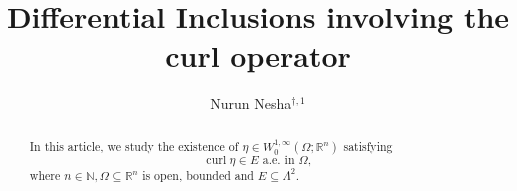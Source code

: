 \documentclass[11pt, a4paper, reqno]{amsart}
\title[Differential Inclusions involving the curl operator]{Differential Inclusions involving the curl operator}
\author[N. Nesha]{ Nurun Nesha$^{\dagger,1}$ }
\numberwithin{equation}{section}
\newcommand{\curl}{\operatorname{curl}}
\begin{document}
\begin{abstract}
In this article, we study the existence of $\eta\in W_0^{1,\infty}(\Omega;\mathbb R^n)$ satisfying $$\curl \eta\in E \textrm{ a.e. in }\Omega,$$
where $n\in \mathbb N, \Omega\subseteq \mathbb R^n$ is open, bounded and $E\subseteq \Lambda^2.$
\end{abstract}
	
\keywords{}
	
\subjclass[2010]{}

 
\maketitle
	
\tableofcontents
	
\end{document}
